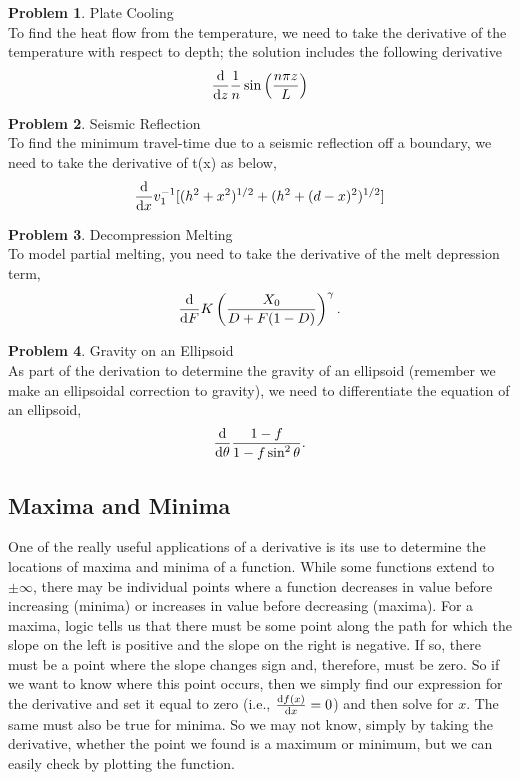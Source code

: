 \documentclass[final,a4paper,12pt]{article}
\theoremstyle{definition}
\newtheorem{problem}{Problem}[section]
\begin{document}
\begin{problem}
    Plate Cooling \\
    To find the heat flow from the temperature, we need to take the derivative
    of the temperature with respect to depth; the solution includes the
    following derivative
    \begin{equation*}
        \dv{}{z} \frac{1}{n} \sin \left( \frac{n \pi z}{L} \right)
    \end{equation*}
\end{problem}

\begin{problem}
    Seismic Reflection \\
    To find the minimum travel-time due to a seismic reflection off a boundary,
    we need to take the derivative of t(x) as below,
    \begin{equation*}
        \dv{}{x} v_1^{-1} [ (h^2 + x^2)^{1/2} + (h^2 + (d - x)^2)^{1/2}]
    \end{equation*}
\end{problem}

\begin{problem}
    Decompression Melting \\
    To model partial melting, you need to take the derivative of the melt
    depression term,
    \begin{equation*}
        \dv{}{F} K \left( \frac{X_0}{D + F(1 - D)} \right)^\gamma .
    \end{equation*}
\end{problem}

\begin{problem}
    Gravity on an Ellipsoid \\
    As part of the derivation to determine the gravity of an ellipsoid (remember
    we make an ellipsoidal correction to gravity), we need to differentiate the
    equation of an ellipsoid,
    \begin{equation}
    \dv{}{\theta} \frac{1 - f}{1 - f\sin^2 \theta} .
    \end{equation}
\end{problem}

\subsection{Maxima and Minima}
One of the really useful applications of a derivative is its use to determine
the locations of maxima and minima of a function.  While some functions extend
to $\pm\infty$, there may be individual points where a function decreases in
value before increasing (minima) or increases in value before decreasing
(maxima).  For a maxima, logic tells us that there must be some point along the
path for which the slope on the left is positive and the slope on the right is
negative.  If so, there must be a point where the slope changes sign and,
therefore, must be zero.  So if we want to know where this point occurs, then we
simply find our expression for the derivative and set it equal to zero (i.e.,
$\dv{f(x)}{x} = 0$) and then solve for $x$.  The same must also be true for
minima.  So we may not know, simply by taking the derivative, whether the point
we found is a maximum or minimum, but we can easily check by plotting the
function.
\end{document}
